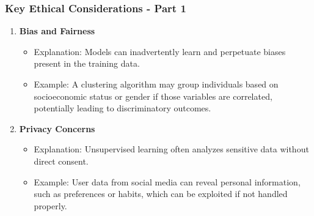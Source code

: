 \documentclass[aspectratio=169]{beamer}
\begin{document}
\begin{frame}[fragile]
    \frametitle{Key Ethical Considerations - Part 1}
    
    \begin{enumerate}
        \item \textbf{Bias and Fairness}
        \begin{itemize}
            \item Explanation: Models can inadvertently learn and perpetuate biases present in the training data.
            \item Example: A clustering algorithm may group individuals based on socioeconomic status or gender if those variables are correlated, potentially leading to discriminatory outcomes.
        \end{itemize}
        
        \item \textbf{Privacy Concerns}
        \begin{itemize}
            \item Explanation: Unsupervised learning often analyzes sensitive data without direct consent.
            \item Example: User data from social media can reveal personal information, such as preferences or habits, which can be exploited if not handled properly.
        \end{itemize}
    \end{enumerate}

\end{frame}
\end{document}
